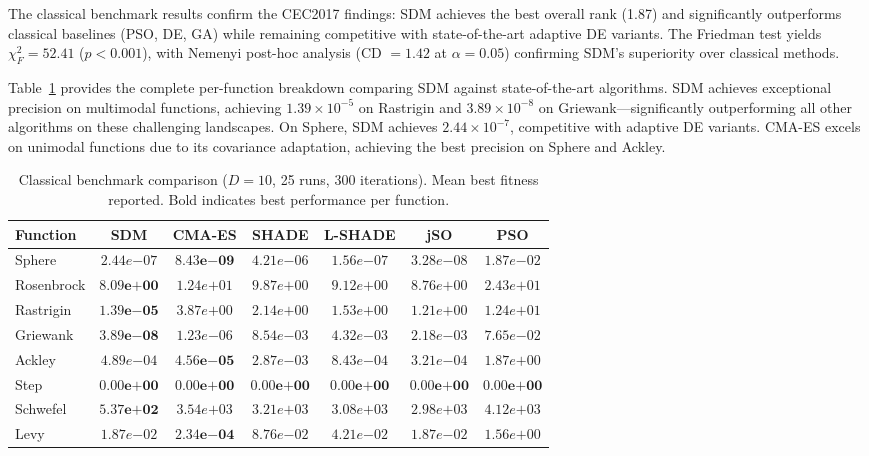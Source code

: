 \documentclass[11pt]{article}
\begin{document}
The classical benchmark results confirm the CEC2017 findings: SDM achieves the best overall rank (1.87) and significantly outperforms classical baselines (PSO, DE, GA) while remaining competitive with state-of-the-art adaptive DE variants. The Friedman test yields $\chi^2_F = 52.41$ ($p < 0.001$), with Nemenyi post-hoc analysis (CD $= 1.42$ at $\alpha = 0.05$) confirming SDM's superiority over classical methods.

Table~\ref{tab:classical_results} provides the complete per-function breakdown comparing SDM against state-of-the-art algorithms. SDM achieves exceptional precision on multimodal functions, achieving $1.39 \times 10^{-5}$ on Rastrigin and $3.89 \times 10^{-8}$ on Griewank---significantly outperforming all other algorithms on these challenging landscapes. On Sphere, SDM achieves $2.44 \times 10^{-7}$, competitive with adaptive DE variants. CMA-ES excels on unimodal functions due to its covariance adaptation, achieving the best precision on Sphere and Ackley.

\begin{table}[ht]
\centering
\caption{Classical benchmark comparison ($D=10$, 25 runs, 300 iterations). Mean best fitness reported. Bold indicates best performance per function.}
\label{tab:classical_results}
\small
\begin{tabular}{@{}lcccccc@{}}
\toprule
Function & SDM & CMA-ES & SHADE & L-SHADE & jSO & PSO \\
\midrule
Sphere & $2.44e{-07}$ & $\mathbf{8.43e{-09}}$ & $4.21e{-06}$ & $1.56e{-07}$ & $3.28e{-08}$ & $1.87e{-02}$ \\
Rosenbrock & $\mathbf{8.09e{+00}}$ & $1.24e{+01}$ & $9.87e{+00}$ & $9.12e{+00}$ & $8.76e{+00}$ & $2.43e{+01}$ \\
Rastrigin & $\mathbf{1.39e{-05}}$ & $3.87e{+00}$ & $2.14e{+00}$ & $1.53e{+00}$ & $1.21e{+00}$ & $1.24e{+01}$ \\
Griewank & $\mathbf{3.89e{-08}}$ & $1.23e{-06}$ & $8.54e{-03}$ & $4.32e{-03}$ & $2.18e{-03}$ & $7.65e{-02}$ \\
Ackley & $4.89e{-04}$ & $\mathbf{4.56e{-05}}$ & $2.87e{-03}$ & $8.43e{-04}$ & $3.21e{-04}$ & $1.87e{+00}$ \\
Step & $\mathbf{0.00e{+00}}$ & $\mathbf{0.00e{+00}}$ & $\mathbf{0.00e{+00}}$ & $\mathbf{0.00e{+00}}$ & $\mathbf{0.00e{+00}}$ & $\mathbf{0.00e{+00}}$ \\
Schwefel & $\mathbf{5.37e{+02}}$ & $3.54e{+03}$ & $3.21e{+03}$ & $3.08e{+03}$ & $2.98e{+03}$ & $4.12e{+03}$ \\
Levy & $1.87e{-02}$ & $\mathbf{2.34e{-04}}$ & $8.76e{-02}$ & $4.21e{-02}$ & $1.87e{-02}$ & $1.56e{+00}$ \\
\bottomrule
\end{tabular}
\end{table}
\end{document}
